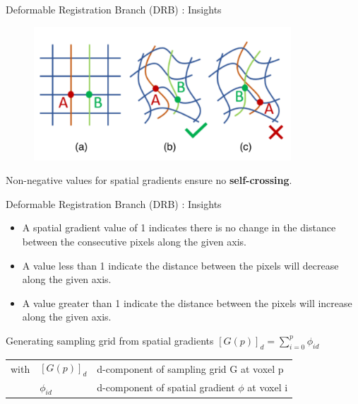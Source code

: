 \documentclass{beamer}
\begin{document}
\begin{frame}{Deformable Registration Branch (DRB) : Insights}
	\begin{figure}
  		\includegraphics[height=5cm]{self-crossing.png}
	\end{figure}
    Non-negative values for spatial gradients ensure no \textbf{self-crossing}.
\end{frame}
\begin{frame}{Deformable Registration Branch (DRB) : Insights}
    \begin{itemize}
        \item A spatial gradient value of 1 indicates there is no change in the distance between the consecutive pixels along the given axis.
        \item A value less than 1 indicate the distance between the pixels will decrease along the given axis.
        \item  A value greater than 1 indicate the distance between the pixels will increase along the given axis.
    \end{itemize}
    \pause
    \begin{block}{Generating sampling grid from spatial gradients}
    \centering
    $[G(p)]_d = \sum_{i=0}^{p}\phi_{id}$
    \end{block}
    \begin{tabular}{l l l }
                    with&$[G(p)]_d$ & d-component of sampling grid G at voxel p  \\
                    &$\phi_{id}$ & d-component of spatial gradient $\phi$ at voxel i \\
    \end{tabular}
\end{frame}
\end{document}
